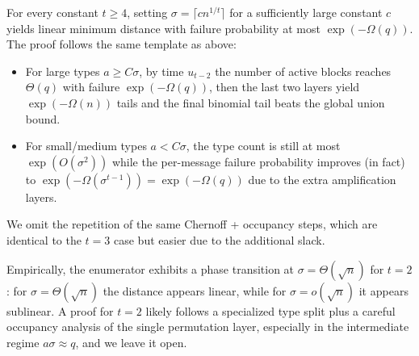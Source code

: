 \begin{remark}\label{rem:bd_tge4}
For every constant $t\ge 4$, setting $\sigma=\lceil c n^{1/t}\rceil$ for a sufficiently large constant $c$ yields linear minimum distance with
failure probability at most $\exp(-\Omega(q))$.
The proof follows the same template as above:
\begin{itemize}
\item For large types $a\ge C\sigma$, by time $u_{t-2}$ the number of active blocks reaches $\Theta(q)$ with failure $\exp(-\Omega(q))$,
then the last two layers yield $\exp(-\Omega(n))$ tails and the final binomial tail beats the global union bound.
\item For small/medium types $a<C\sigma$, the type count is still at most $\exp(O(\sigma^2))$ while the per-message failure probability
improves (in fact) to $\exp(-\Omega(\sigma^{t-1}))=\exp(-\Omega(q))$ due to the extra amplification layers.
\end{itemize}
We omit the repetition of the same Chernoff + occupancy steps, which are identical to the $t=3$ case but easier due to the additional slack.
\end{remark}

\begin{remark}[On the case $t=2$]\label{rem:bd_t2}
Empirically, the enumerator exhibits a phase transition at $\sigma=\Theta(\sqrt{n})$ for $t=2$:
for $\sigma=\Theta(\sqrt{n})$ the distance appears linear, while for $\sigma=o(\sqrt{n})$ it appears sublinear.
A proof for $t=2$ likely follows a specialized type split plus a careful occupancy analysis of the single permutation layer,
especially in the intermediate regime $a\sigma\approx q$, and we leave it open.
\end{remark}
